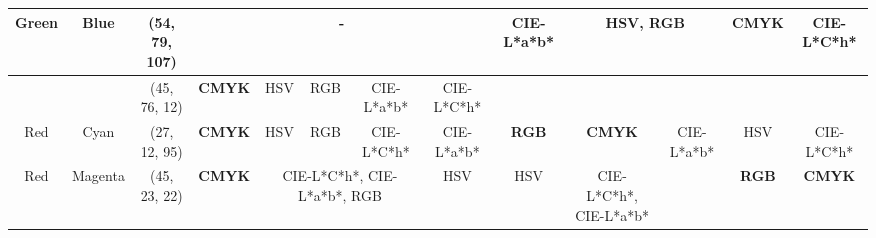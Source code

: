 \begin{table}[htbp]
{\begin{tabular}{@{}ccclcccccccccc@{}}
    Green                   & \multicolumn{1}{c|}{Blue}                      & \multicolumn{2}{c|}{\cellcolor[HTML]{00FFFF}(54, 79, 107)} & \multicolumn{5}{c|}{-}                                                                                                                                                                                & \multicolumn{1}{c|}{CIE-L*a*b*}                      & \multicolumn{2}{c|}{\textbf{HSV, RGB}}                                                                   & \multicolumn{1}{c|}{\textbf{CMYK}}                & \multicolumn{1}{c|}{CIE-L*C*h*}                   \\ \midrule
                            & \multicolumn{1}{c|}{}                          & \multicolumn{2}{c|}{\cellcolor[HTML]{80FF00}(45, 76, 12)}  & \multicolumn{1}{c|}{\textbf{CMYK}}                         & \multicolumn{1}{c|}{HSV}           & \multicolumn{1}{c|}{RGB}        & \multicolumn{1}{c|}{CIE-L*a*b*} & \multicolumn{1}{c|}{CIE-L*C*h*} & \multicolumn{1}{c|}{}                                & \multicolumn{1}{c|}{}                                & \multicolumn{1}{c|}{}                             & \multicolumn{1}{c|}{}                             & \multicolumn{1}{c|}{}                             \\ \cmidrule(lr){3-9}
    \multirow{-2}{*}{Red}   & \multicolumn{1}{c|}{\multirow{-2}{*}{Cyan}}    & \multicolumn{2}{c}{\cellcolor[HTML]{7F00FF}(27, 12, 95)}   & \multicolumn{1}{c|}{\textbf{CMYK}}                         & \multicolumn{1}{c|}{HSV}           & \multicolumn{1}{c|}{RGB}        & \multicolumn{1}{c|}{CIE-L*C*h*} & \multicolumn{1}{c|}{CIE-L*a*b*} & \multicolumn{1}{c|}{\multirow{-2}{*}{\textbf{RGB}}}  & \multicolumn{1}{c|}{\multirow{-2}{*}{\textbf{CMYK}}} & \multicolumn{1}{c|}{\multirow{-2}{*}{CIE-L*a*b*}} & \multicolumn{1}{c|}{\multirow{-2}{*}{HSV}}        & \multicolumn{1}{c|}{\multirow{-2}{*}{CIE-L*C*h*}} \\ \midrule
    Red                     & \multicolumn{1}{c|}{Magenta}                   & \multicolumn{2}{c|}{\cellcolor[HTML]{FF0080}(45, 23, 22)}  & \multicolumn{1}{c|}{\textbf{CMYK}}                         & \multicolumn{3}{c|}{CIE-L*C*h*, CIE-L*a*b*, RGB}                                                       & \multicolumn{1}{c|}{HSV}        & \multicolumn{1}{c|}{HSV}                             & \multicolumn{1}{c|}{CIE-L*C*h*, CIE-L*a*b*}          & \multicolumn{1}{c|}{}                             & \multicolumn{1}{c|}{\textbf{RGB}}                 & \multicolumn{1}{c|}{\textbf{CMYK}}                \\ \midrule

\end{tabular}}
\end{table}
